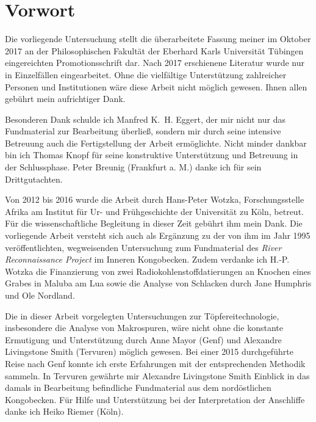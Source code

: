 \pagestyle{empty}
\setcounter{secnumdepth}{3}		%
\setcounter{tocdepth}{3}
\tableofcontents
\cleardoublepage

\thispagestyle{empty}
\section*{Vorwort}
\begin{multicols}{2}
\raggedcolumns
\noindent Die vorliegende Untersuchung stellt die überarbeitete Fassung meiner im Oktober 2017 an der Philosophischen Fakultät der Eberhard Karls Universität Tübingen eingereichten Promotionsschrift dar. Nach 2017 erschienene Literatur wurde nur in Einzelfällen eingearbeitet. Ohne die vielfältige Unterstützung zahlreicher Personen und Institutionen wäre diese Arbeit nicht möglich gewesen. Ihnen allen gebührt mein aufrichtiger Dank.

Besonderen Dank schulde ich Manfred K.~H. Eggert, der mir nicht nur das Fundmaterial zur Bearbeitung überließ, sondern mir durch seine intensive Betreuung auch die Fertigstellung der Arbeit ermöglichte. Nicht minder dankbar bin ich Thomas Knopf für seine konstruktive Unterstützung und Betreuung in der Schlussphase. Peter Breunig (Frankfurt a. M.) danke ich für sein Drittgutachten.

Von 2012 bis 2016 wurde die Arbeit durch Hans-Peter Wotzka, Forschungsstelle Afrika am Institut für Ur- und Frühgeschichte der Universität zu Köln, betreut. Für die wissenschaftliche Begleitung in dieser Zeit gebührt ihm mein Dank. Die vorliegende Arbeit versteht sich auch als Ergänzung zu der von ihm im Jahr 1995 veröffentlichten, wegweisenden Untersuchung zum Fundmaterial des \textit{River Reconnaissance Project} im Inneren Kongobecken. Zudem verdanke ich H.-P. Wotzka die Finanzierung von zwei Radiokohlenstoffdatierungen an Knochen eines Grabes in Maluba am Lua sowie die Analyse von Schlacken durch Jane Humphris und Ole Nordland. 

Die in dieser Arbeit vorgelegten Untersuchungen zur Töpfereitechnologie, insbesondere die Analyse von Makrospuren, wäre nicht ohne die konstante Ermutigung und Unterstützung durch Anne Mayor (Genf) und \mbox{Alexandre} \mbox{Livingstone} Smith (Tervuren) möglich gewesen. Bei einer 2015 durchgeführte Reise nach Genf konnte ich erste Erfahrungen mit der entsprechenden Methodik sammeln. In Tervuren gewährte mir \mbox{Alexandre} Livingstone Smith Einblick in das damals in Bearbeitung befindliche Fundmaterial aus dem nordöstlichen Kongobecken. Für Hilfe und Unterstützung bei der Interpretation der Anschliffe danke ich Heiko Riemer (Köln).


\end{multicols}
